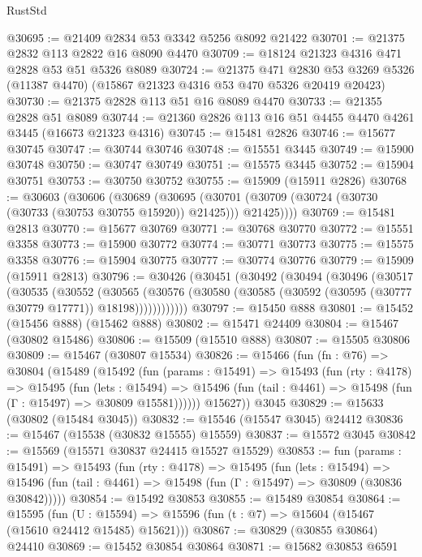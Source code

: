 \begin{lexlean}{RustStd}
\begin{coremodule}
@30695 := @21409 @2834 @53 @3342 @5256 @8092 @21422
@30701 := @21375 @2832 @113 @2822 @16 @8090 @4470
@30709 := @18124 @21323 @4316 @471 @2828 @53 @51 @5326 @8089
@30724 := @21375
    @471
    @2830
    @53
    @3269
    @5326
    (@11387 @4470)
    (@15867 @21323 @4316 @53 @470 @5326 @20419 @20423)
@30730 := @21375 @2828 @113 @51 @16 @8089 @4470
@30733 := @21355 @2828 @51 @8089
@30744 := @21360 @2826 @113 @16 @51 @4455 @4470 @4261 @3445 (@16673 @21323 @4316)
@30745 := @15481 @2826
@30746 := @15677 @30745
@30747 := @30744 @30746
@30748 := @15551 @3445
@30749 := @15900 @30748
@30750 := @30747 @30749
@30751 := @15575 @3445
@30752 := @15904 @30751
@30753 := @30750 @30752
@30755 := @15909 (@15911 @2826)
@30768 := @30603
    (@30606
      (@30689
        (@30695 (@30701 (@30709 (@30724 (@30730 (@30733 (@30753 @30755 @15920)) @21425))) @21425))))
@30769 := @15481 @2813
@30770 := @15677 @30769
@30771 := @30768 @30770
@30772 := @15551 @3358
@30773 := @15900 @30772
@30774 := @30771 @30773
@30775 := @15575 @3358
@30776 := @15904 @30775
@30777 := @30774 @30776
@30779 := @15909 (@15911 @2813)
@30796 := @30426
    (@30451
      (@30492
        (@30494
          (@30496
            (@30517
              (@30535
                (@30552
                  (@30565
                    (@30576
                      (@30580 (@30585 (@30592 (@30595 (@30777 @30779 @17771)) @18198))))))))))))
@30797 := @15450 @888
@30801 := @15452 (@15456 @888) (@15462 @888)
@30802 := @15471 @24409
@30804 := @15467 (@30802 @15486)
@30806 := @15509 (@15510 @888)
@30807 := @15505 @30806
@30809 := @15467 (@30807 @15534)
@30826 := @15466
    (fun (fn : @76) =>
    @30804
      (@15489
        (@15492
          (fun (params : @15491) =>
          @15493
            (fun (rty : @4178) =>
            @15495
              (fun (lets : @15494) =>
              @15496 (fun (tail : @4461) => @15498 (fun (Γ : @15497) => @30809 @15581))))))
        @15627))
    @3045
@30829 := @15633 (@30802 (@15484 @3045))
@30832 := @15546 (@15547 @3045) @24412
@30836 := @15467 (@15538 (@30832 @15555) @15559)
@30837 := @15572 @3045
@30842 := @15569 (@15571 @30837 @24415 @15527 @15529)
@30853 := fun (params : @15491) =>
  @15493
    (fun (rty : @4178) =>
    @15495
      (fun (lets : @15494) =>
      @15496 (fun (tail : @4461) => @15498 (fun (Γ : @15497) => @30809 (@30836 @30842)))))
@30854 := @15492 @30853
@30855 := @15489 @30854
@30864 := @15595
    (fun (U : @15594) => @15596 (fun (t : @7) => @15604 (@15467 (@15610 @24412 @15485) @15621)))
@30867 := @30829 (@30855 @30864) @24410
@30869 := @15452 @30854 @30864
@30871 := @15682 @30853 @6591

\end{coremodule}
\end{lexlean}
